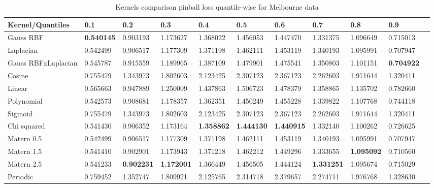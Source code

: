 \begin{table}[!h]
    \caption{Kernels comparison pinball loss quantile-wise for Melbourne data}
    \label{tab:kernel pinball comparison quantile-wise}
    \begin{adjustbox}{width=\textwidth}
    \begin{tabular}{lllllllllll}
    \toprule
    Kernel/Quantiles & 0.1 & 0.2 & 0.3 & 0.4 & 0.5 & 0.6 & 0.7 & 0.8 & 0.9 \\
    \midrule
    Gauss RBF &  \textbf{0.540145} &
    0.903193 &
    1.173627 &
    1.368022 &
    1.456053 &
    1.447470 &
    1.331375 &
    1.096649 &
    0.715013 \\
    Laplacian &  0.542499 &
    0.906517 &
    1.177309 &
    1.371198 &
    1.462111 &
    1.453119 &
    1.340193 &
    1.095991 &
    0.707947 \\
    Gauss RBFxLaplacian &0.545787 &
    0.915559 &
    1.189965 &
    1.387109 &
    1.479901 &
    1.475541 &
    1.350803 &
    1.101151 &
    \textbf{0.704922} \\
    Cosine & 0.755479 &
    1.343973 &
    1.802603 &
    2.123425 &
    2.307123 &
    2.367123 &
    2.262603 &
    1.971644 &
    1.320411 \\
    Linear &  0.565663 &
    0.947889 &
    1.250009 &
    1.437863 &
    1.506723 &
    1.478379 &
    1.358865 &
    1.135702 &
    0.782660   \\
    Polynomial &   0.542573 &
    0.908681 &
    1.178357 &
    1.362351 &
    1.450249 &
    1.455228 &
    1.339822 &
    1.107768 &
    0.744118  \\
    Sigmoid &   0.755479 &
    1.343973 &
    1.802603 &
    2.123425 &
    2.307123 &
    2.367123 &
    2.262603 &
    1.971644 &
    1.320411          \\
    Chi squared &   0.541430 &
    0.906352 &
    1.173164 &
    \textbf{1.358862} &
    \textbf{1.444130} &
    \textbf{1.440915} &
    1.332140 &
    1.100262 &
    0.726625     \\
    Matern 0.5 &  0.542499 &
    0.906517 &
    1.177309 &
    1.371198 &
    1.462111 &
    1.453119 &
    1.340193 &
    1.095991 &
    0.707947 \\
    Matern 1.5 &  0.541410 &
    0.902901 &
    1.173943 &
    1.371218 &
    1.462212 &
    1.449296 &
    1.333655 &
    \textbf{1.095092} &
    0.710560 \\
    Matern 2.5 &  0.541233 &
    \textbf{0.902231} &
    \textbf{1.172001} &
    1.366449 &
    1.456505 &
    1.444124 &
    \textbf{1.331251} &
    1.095674 &
    0.715029 \\
    Periodic  & 0.759452 &
    1.352747 &
    1.809921 &
    2.125765 &
    2.314718 &
    2.379657 &
    2.274711 &
    1.976768 &
    1.328630 \\
    \bottomrule
    \end{tabular}
    \end{adjustbox}
\end{table}


